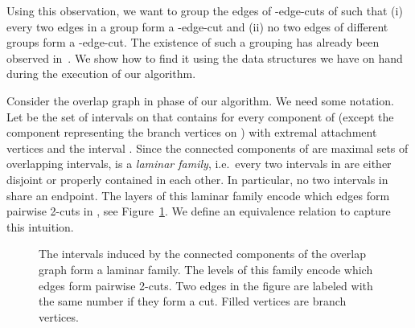 \documentclass[paper=a4]{scrartcl}
\begin{document}
Using this observation, we want to group the edges of -edge-cuts of  such that (i) every two edges in a group form a -edge-cut and (ii) no two edges of different groups form a -edge-cut. The existence of such a grouping has already been observed in~\cite{Nagamochi1992a,Taoka1992,Tsin2009}. We show how to find it using the data structures we have on hand during the execution of our algorithm.

Consider the overlap graph  in phase  of our algorithm. We need some notation. Let  be the set of intervals on  that contains for every component of  (except the component representing the branch vertices on ) with extremal attachment vertices  and  the interval . Since the connected components of  are maximal sets of overlapping intervals,  is a \emph{laminar family}, i.e.\ every two intervals in  are either disjoint or properly contained in each other. In particular, no two intervals in  share an endpoint.
The layers of this laminar family encode which edges form pairwise 2-cuts in , see Figure~\ref{fig:laminar family}. We define an equivalence relation to capture this intuition.

\begin{figure}
\centering
{}
\caption{The intervals induced by the connected components of the overlap graph  form a laminar family. The levels of this family encode which edges form pairwise 2-cuts. Two edges in the figure are labeled with the same number if they form a cut. Filled vertices are branch vertices.}
\label{fig:laminar family}
\end{figure}
\end{document}
